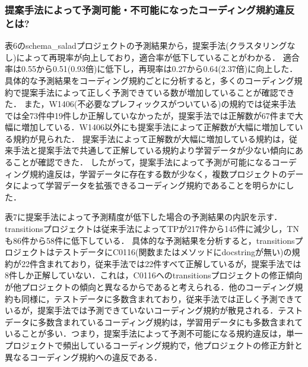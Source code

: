 \documentclass[submit,noauthor,ses,dvipdfmx]{ipsj}
\newcommand{\todo}[1]{\colorbox{yellow}{{\bf TODO}:}{\color{red} {\textbf{[#1]}}}}
\newcommand{\done}[1]{\colorbox{green}{{\bf Done}:}{\color{black} {\textbf{[#1]}}}}
\begin{document}
\subsubsection{提案手法によって予測可能・不可能になったコーディング規約違反とは?}

表6のschema\_saladプロジェクトの予測結果から，提案手法(クラスタリングなし)によって再現率が向上しており，適合率が低下していることがわかる．
適合率は0.55から0.51(0.93倍)に低下し，再現率は0.27から0.64(2.37倍)に向上した．
具体的な予測結果をコーディング規約ごとに分析すると，多くのコーディング規約で提案手法によって正しく予測できている数が増加していることが確認できた．
また，W1406(不必要なプレフィックスがついている)の規約では従来手法では全73件中19件しか正解していなかったが，提案手法では正解数が67件まで大幅に増加している．W1406以外にも提案手法によって正解数が大幅に増加している規約が見られた．
提案手法によって正解数が大幅に増加している規約は，従来手法と提案手法で共通して正解している規約より学習データが少ない傾向にあることが確認できた．
したがって，提案手法によって予測が可能になるコーディング規約違反は，学習データに存在する数が少なく，複数プロジェクトのデータによって学習データを拡張できるコーディング規約であることを明らかにした．


表7に提案手法によって予測精度が低下した場合の予測結果の内訳を示す．
transitionsプロジェクトは従来手法によってTPが217件から145件に減少し，TNも86件から58件に低下している．
具体的な予測結果を分析すると，transitionsプロジェクトはテストデータにC0116(関数またはメソッドにdocstringが無い)の規約が22件含まれており，従来手法では22件すべて正解しているが，提案手法では8件しか正解していない．これは，C0116へのtransitionsプロジェクトの修正傾向が他プロジェクトの傾向と異なるからであると考えられる．他のコーディング規約も同様に，テストデータに多数含まれており，従来手法では正しく予測できているが，提案手法では予測できていないコーディング規約が散見される．テストデータに多数含まれているコーディング規約は，学習用データにも多数含まれていることが多い．つまり，提案手法によって予測不可能になる規約違反は，単一プロジェクトで頻出しているコーディング規約で，他プロジェクトの修正方針と異なるコーディング規約への違反である．
\end{document}

